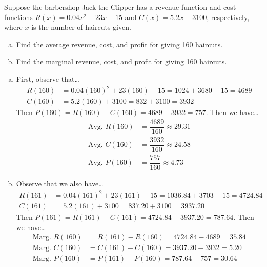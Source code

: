 \documentclass[11pt,letterpaper]{article}
\begin{document}
\newpage



 Suppose the barbershop Jack the Clipper has a revenue function and cost functions $R(x)= 0.04x^2 + 23x - 15$ and $C(x)= 5.2x + 3100$, respectively, where $x$ is the number of haircuts given. 
	\begin{enumerate}[(a)]
	\item Find the average revenue, cost, and profit for giving 160 haircuts.
	\item Find the marginal revenue, cost, and profit for giving 160 haircuts. 
	\end{enumerate} \pspace

\sol
\begin{enumerate}[(a)]
\item First, observe that\dots
	\[
	\begin{aligned}
	R(160)&= 0.04(160)^2 + 23(160) - 15= 1024 + 3680 - 15= 4689 \\
	C(160)&= 5.2(160) + 3100= 832 + 3100= 3932
	\end{aligned}
	\]
Then $P(160)= R(160) - C(160)= 4689 - 3932= 757$. Then we have\dots
	\[
	\begin{aligned}
	\text{Avg. }R(160)&= \dfrac{4689}{160} \approx 29.31 \\
	\text{Avg. }C(160)&= \dfrac{3932}{160} \approx 24.58 \\
	\text{Avg. }P(160)&= \dfrac{757}{160} \approx 4.73
	\end{aligned}
	\] \pspace

\item Observe that we also have\dots
	\[
	\begin{aligned}
	R(161)&= 0.04(161)^2 + 23(161) - 15= 1036.84 + 3703 - 15= 4724.84 \\
	C(161)&= 5.2(161) + 3100= 837.20 + 3100= 3937.20
	\end{aligned}
	\]
Then $P(161)= R(161) - C(161)= 4724.84 - 3937.20= 787.64$. Then we have\dots
	\[
	\begin{aligned}
	\text{Marg. }R(160)&= R(161) - R(160)= 4724.84 - 4689= 35.84 \\
	\text{Marg. }C(160)&= C(161) - C(160)= 3937.20 - 3932= 5.20 \\
	\text{Marg. }P(160)&= P(161) - P(160)= 787.64 - 757= 30.64
	\end{aligned}
	\]
\end{enumerate}



\newpage
\end{document}
